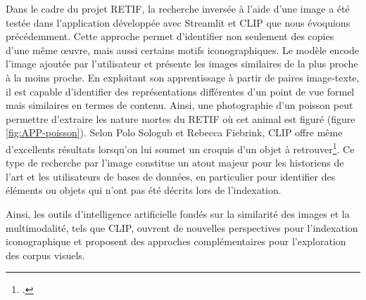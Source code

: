 Dans le cadre du projet RETIF, la recherche inversée à l’aide d’une image a été testée dans l’application développée avec Streamlit et CLIP que nous évoquions précédemment. Cette approche permet d’identifier non seulement des copies d’une même œuvre, mais aussi certains motifs iconographiques. Le modèle encode l’image ajoutée par l’utilisateur et présente les images similaires de la plus proche à la moins proche. En exploitant son apprentissage à partir de paires image‑texte, il est capable d’identifier des représentations différentes d’un point de vue formel mais similaires en termes de contenu. Ainsi, une photographie d’un poisson peut permettre d’extraire les nature mortes du RETIF où cet animal est figuré (figure \ref{fig:APP-poisson}). Selon Polo Sologub et Rebecca Fiebrink, CLIP offre même d’excellents résultats lorsqu’on lui soumet un croquis d’un objet à retrouver\footcite{sologubSketchyCollectionsExploring2024}. Ce type de recherche par l’image constitue un atout majeur pour les historiens de l’art et les utilisateurs de bases de données, en particulier pour identifier des éléments ou objets qui n’ont pas été décrits lors de l’indexation.

\bigskip

Ainsi, les outils d’intelligence artificielle fondés sur la similarité des images et la multimodalité, tels que CLIP, ouvrent de nouvelles perspectives pour l’indexation iconographique et proposent des approches complémentaires pour l’exploration des corpus visuels.